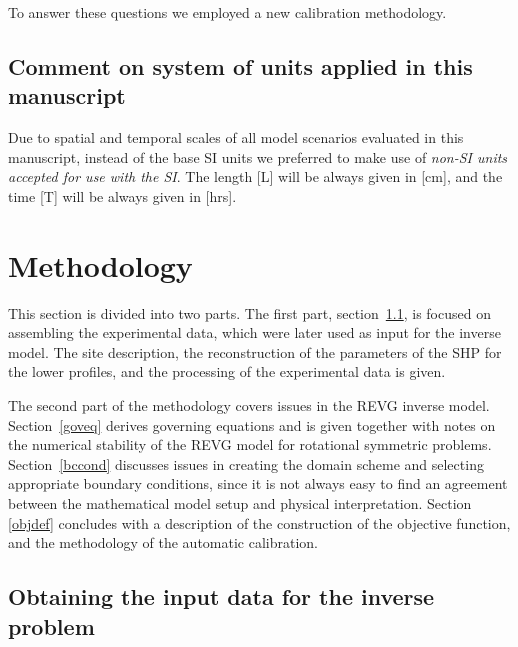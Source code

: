 \documentclass[review,times,3p,10pt]{elsarticle}
\begin{document}
To answer these questions we employed a new calibration methodology. 




\subsection{Comment on system of units applied in this manuscript}

Due to spatial and temporal scales of all model scenarios evaluated in this manuscript, instead of the base SI units we preferred to make use of {\it non-SI units  accepted for use with the SI}. The length [L] will be always given in [cm], and the time [T] will be always given in [hrs].






\section{Methodology}%
\label{metodo}


This section is divided into two parts. The first part, section~\ref{assamb}, is focused on assembling the experimental data, which were later used as input for the inverse model. The site description, the reconstruction of the parameters of the SHP for the lower profiles, and the processing of the experimental data is given.   

The second part of the methodology covers issues in the REVG inverse model. Section~\ref{goveq} derives governing equations and is given together with notes on the numerical stability of the REVG model for rotational symmetric problems.
Section~\ref{bccond} discusses issues in creating the domain scheme and selecting appropriate boundary conditions, since it is not always easy to find an agreement between the mathematical model setup and  physical interpretation. Section \ref{objdef} concludes with a description of the construction of the objective function, and the methodology of the automatic calibration. 



\subsection{Obtaining the input data for the inverse problem}
\label{assamb}
\end{document}
